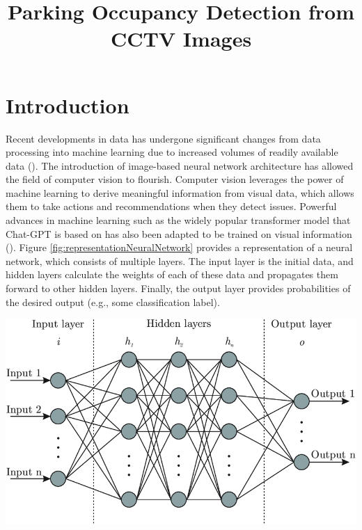 \documentclass[man]{apa7}
\title{Parking Occupancy Detection from CCTV Images}
\begin{document}
\maketitle
\tableofcontents
\newpage
\section{Introduction}
Recent developments in data has undergone significant changes from data processing into machine learning due to increased volumes of readily available data (\textcite{KHAN20201444}). The introduction of image-based neural network architecture has allowed the field of computer vision to flourish. Computer vision leverages the power of machine learning to derive meaningful information from visual data, which allows them to take actions and recommendations when they detect issues. Powerful advances in machine learning such as the widely popular transformer model that Chat-GPT is based on has also been adapted to be trained on visual information (\textcite{elnouby2021training}). Figure \ref{fig:representationNeuralNetwork} provides a representation of a neural network, which consists of multiple layers. The input layer is the initial data, and hidden layers calculate the weights of each of these data and propagates them forward to other hidden layers. Finally, the output layer provides probabilities of the desired output (e.g., some classification label).

\begin{minipage}{\linewidth}
  \includegraphics[height=\textheight/4 ,width=\textwidth/1]{figures/sampleNeuralNetwork.png}
  \label{fig:representationNeuralNetwork}
\end{minipage}
\end{document}
